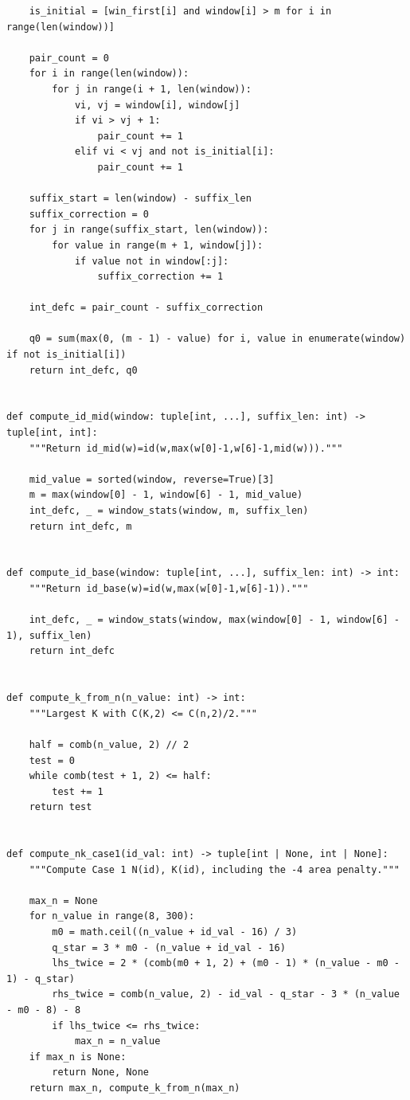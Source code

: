 \documentclass[11pt]{article}
\theoremstyle{plain}
\theoremstyle{definition}
\theoremstyle{remark}
\begin{document}
\begin{lstlisting}
    is_initial = [win_first[i] and window[i] > m for i in range(len(window))]

    pair_count = 0
    for i in range(len(window)):
        for j in range(i + 1, len(window)):
            vi, vj = window[i], window[j]
            if vi > vj + 1:
                pair_count += 1
            elif vi < vj and not is_initial[i]:
                pair_count += 1

    suffix_start = len(window) - suffix_len
    suffix_correction = 0
    for j in range(suffix_start, len(window)):
        for value in range(m + 1, window[j]):
            if value not in window[:j]:
                suffix_correction += 1

    int_defc = pair_count - suffix_correction

    q0 = sum(max(0, (m - 1) - value) for i, value in enumerate(window) if not is_initial[i])
    return int_defc, q0


def compute_id_mid(window: tuple[int, ...], suffix_len: int) -> tuple[int, int]:
    """Return id_mid(w)=id(w,max(w[0]-1,w[6]-1,mid(w)))."""

    mid_value = sorted(window, reverse=True)[3]
    m = max(window[0] - 1, window[6] - 1, mid_value)
    int_defc, _ = window_stats(window, m, suffix_len)
    return int_defc, m


def compute_id_base(window: tuple[int, ...], suffix_len: int) -> int:
    """Return id_base(w)=id(w,max(w[0]-1,w[6]-1))."""

    int_defc, _ = window_stats(window, max(window[0] - 1, window[6] - 1), suffix_len)
    return int_defc


def compute_k_from_n(n_value: int) -> int:
    """Largest K with C(K,2) <= C(n,2)/2."""

    half = comb(n_value, 2) // 2
    test = 0
    while comb(test + 1, 2) <= half:
        test += 1
    return test


def compute_nk_case1(id_val: int) -> tuple[int | None, int | None]:
    """Compute Case 1 N(id), K(id), including the -4 area penalty."""

    max_n = None
    for n_value in range(8, 300):
        m0 = math.ceil((n_value + id_val - 16) / 3)
        q_star = 3 * m0 - (n_value + id_val - 16)
        lhs_twice = 2 * (comb(m0 + 1, 2) + (m0 - 1) * (n_value - m0 - 1) - q_star)
        rhs_twice = comb(n_value, 2) - id_val - q_star - 3 * (n_value - m0 - 8) - 8
        if lhs_twice <= rhs_twice:
            max_n = n_value
    if max_n is None:
        return None, None
    return max_n, compute_k_from_n(max_n)



\end{lstlisting}
\end{document}
